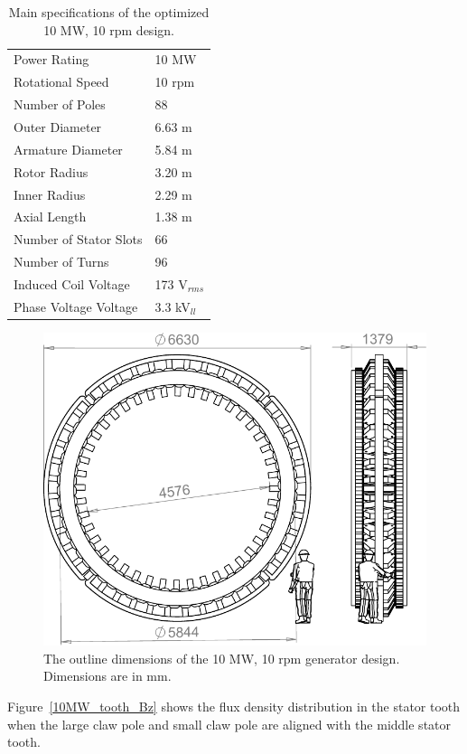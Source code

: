 \documentclass[12pt]{iopart}
\begin{document}
\begin{table}[]
  \centering
  \begin{tabular}{ll}
\hline
Power Rating & 10 MW \\
Rotational Speed & 10 rpm \\
Number of Poles & 88 \\
\hline
Outer Diameter & 6.63 m \\
Armature Diameter & 5.84 m \\
Rotor Radius & 3.20 m \\
Inner Radius & 2.29 m \\
Axial Length & 1.38 m \\
\hline
Number of Stator Slots & 66 \\
Number of Turns & 96 \\
Induced Coil Voltage & 173 V$_{rms}$\\
Phase Voltage Voltage & 3.3 kV$_{ll}$ \\
\hline
 \end{tabular}
  \caption{Main specifications of the optimized 10 MW, 10 rpm design.}
  \label{10MW_spec}
\end{table}

\begin{figure}[]
  \centering
    \includegraphics[]{10MW_outline_drawing}
  \caption{The outline dimensions of the 10 MW, 10 rpm generator design. Dimensions are in mm.}
  \label{10MW_drawing}
\end{figure}

Figure~\ref{10MW_tooth_Bz} shows the flux density distribution in the stator tooth when the large claw pole and small claw pole are aligned with the middle stator tooth. 
\end{document}
